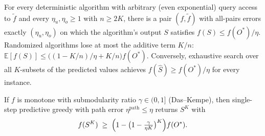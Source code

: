 \begin{theorem}\label{thm:ceiling}
For every deterministic algorithm with arbitrary (even exponential) query access
to $\tilde f$ and every $\eta_u,\eta_o \ge 1$ with $n\ge 2K$, there is a pair
$(f,\tilde f)$ with all-pairs errors exactly $(\eta_u,\eta_o)$ on which the
algorithm's output $S$ satisfies $f(S)\le f(O^\ast)/\eta$. Randomized
algorithms lose at most the additive term $K/n$:
$\mathbb{E}[f(S)] \le \bigl((1-K/n)/\eta + K/n\bigr) f(O^\ast)$.
Conversely, exhaustive search over all $K$-subsets of the predicted values
achieves $f(\hat S) \ge f(O^\ast)/\eta$ for every instance.
\end{theorem}

\begin{corollary}\label{cor:weak}
If $f$ is monotone with submodularity ratio $\gamma\in(0,1]$ (Das--Kempe), then
single-step predictive greedy with path error $\eta^{\mathrm{path}}\le\eta$
returns $S^K$ with
\[
  f(S^K) \;\ge\; \Bigl(1-\bigl(1-\tfrac{\gamma}{\eta K}\bigr)^{K}\Bigr) f(O^\ast).
\]
\end{corollary}

